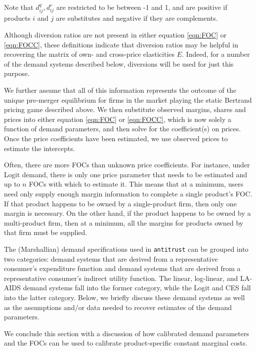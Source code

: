 \documentclass[11pt,numbers=noenddot,pointlessnumbers]{scrreprt}
\newcommand{\atr}{{\tt antitrust}}
\numberwithin{equation}{section}
\begin{document}
Note that $d^q_{ij},d^r_{ij}$ are restricted to be between -1 and 1,
and are positive if products $i$ and $j$ are substitutes and negative if they are complements.

Although diversion ratios are not present in either equation
\ref{eqn:FOC} or \ref{eqn:FOCC}, these definitions indicate that diversion ratios may
be helpful in recovering the matrix of own- and cross-price
elasticities $E$. Indeed, for a number of the demand
systems described below, diversions will be used for just this
purpose.



We further assume that all of this information
represents the outcome of the unique pre-merger
equilibrium for firms in the
market playing the static Bertrand pricing game described above.
We then substitute observed margins, shares and prices into
either equation \ref{eqn:FOC} or \ref{eqn:FOCC}, which is now solely a function of demand
parameters, and then solve for the coefficient(s) on prices. Once the
price coefficients have been estimated, we use observed prices to
estimate the intercepts.

Often, there are more FOCs than unknown price
coefficients. For instance, under Logit demand, there is only one
price parameter that needs to be estimated and up to $n$ FOCs with
which to estimate it. This means that at a minimum, users need only
supply enough margin information to complete a single product's
FOC. If that product happens to be owned by a single-product firm,
then only one margin is necessary. On the other hand, if the product
happens to be owned by a multi-product firm, then at a minimum, all the margins for
products owned by that firm must be supplied.


The (Marshallian) demand specifications used in \atr{} can be grouped into two
categories: demand systems that are derived from a
representative consumer's
expenditure function and demand systems that are derived from a
representative consumer's indirect utility function. The linear, log-linear,
and LA-AIDS demand systems fall into the former
category, while the Logit and CES fall into
the latter category. Below, we briefly
discuss these demand systems as well as the assumptions
and/or data needed to recover estimates of the demand parameters.

We conclude this section with a discussion of how calibrated demand parameters and
the FOCs can be used to calibrate product-specific constant marginal costs.
\end{document}
